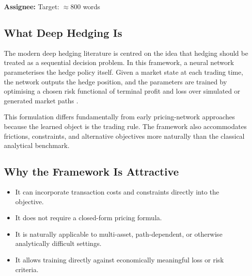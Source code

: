 \documentclass[12pt, a4paper]{article}
\begin{document}
\begin{assignbox}
\textbf{Assignee:} \underline{\hspace{4cm}} \quad Target: $\approx 800$ words
\end{assignbox}


\subsection{What Deep Hedging Is}
\label{subsec:dh_core}

The modern deep hedging literature is centred on the idea that hedging should be
treated as a sequential decision problem. In this framework, a neural network
parameterises the hedge policy itself. Given a market state at each trading time, the
network outputs the hedge position, and the parameters are trained by optimising a
chosen risk functional of terminal profit and loss over simulated or generated market
paths \citep{BuehlerEtAl2019}.

This formulation differs fundamentally from early pricing-network approaches because
the learned object is the trading rule. The framework also accommodates frictions,
constraints, and alternative objectives more naturally than the classical analytical
benchmark.


\subsection{Why the Framework Is Attractive}
\label{subsec:dh_attractive}

\begin{itemize}
    \item It can incorporate transaction costs and constraints directly into the
          objective.
    \item It does not require a closed-form pricing formula.
    \item It is naturally applicable to multi-asset, path-dependent, or otherwise
          analytically difficult settings.
    \item It allows training directly against economically meaningful loss or risk
          criteria.
\end{itemize}
\end{document}

